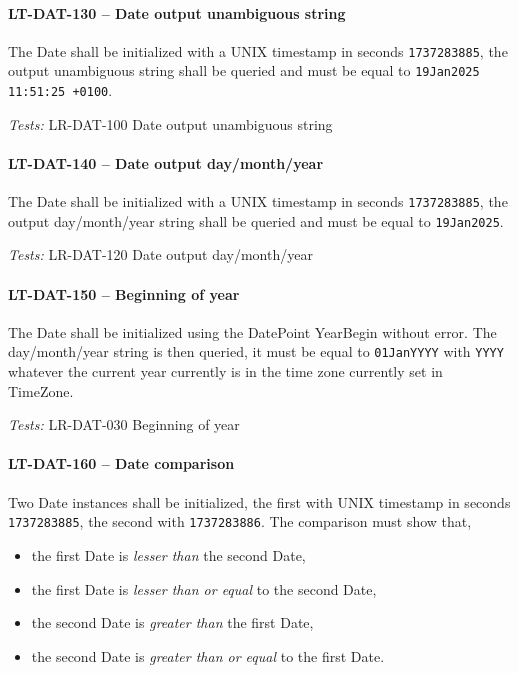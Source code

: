 \paragraph{LT-DAT-130 -- Date output unambiguous string}
The Date shall be initialized with a UNIX timestamp in seconds
\lstinline{1737283885}, the output unambiguous string shall
be queried and must be equal to \lstinline{19Jan2025 11:51:25 +0100}.

\textit{Tests: } LR-DAT-100 Date output unambiguous string

\paragraph{LT-DAT-140 -- Date output day/month/year}
The Date shall be initialized with a UNIX timestamp in seconds
\lstinline{1737283885}, the output day/month/year string shall
be queried and must be equal to \lstinline{19Jan2025}.

\textit{Tests: } LR-DAT-120 Date output day/month/year

\paragraph{LT-DAT-150 -- Beginning of year}
The Date shall be initialized using the DatePoint YearBegin without error.
The day/month/year string is then queried, it must be equal to
\lstinline{01JanYYYY} with \lstinline{YYYY} whatever the current year
currently is in the time zone currently set in TimeZone.

\textit{Tests: } LR-DAT-030 Beginning of year

\paragraph{LT-DAT-160 -- Date comparison}
Two Date instances shall be initialized, the first with
UNIX timestamp in seconds \lstinline{1737283885}, the second with
\lstinline{1737283886}.
The comparison must show that,
\begin{itemize}
\item the first Date is \emph{lesser than} the second Date,
\item the first Date is \emph{lesser than or equal} to the second Date,
\item the second Date is \emph{greater than} the first Date,
\item the second Date is \emph{greater than or equal} to the first Date.
\end{itemize}

